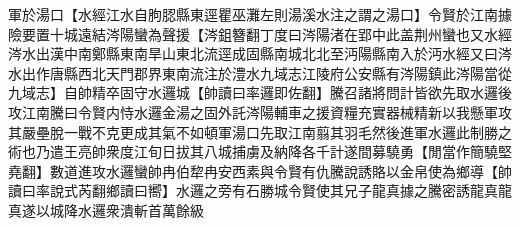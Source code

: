 軍於湯口【水經江水自朐䏰縣東逕瞿巫灘左則湯溪水注之謂之湯口】令賢於江南據險要置十城遠結涔陽蠻為聲援【涔鉏簪翻丁度曰涔陽渚在郢中此盖荆州蠻也又水經涔水出漢中南鄭縣東南旱山東北流逕成固縣南城北北至沔陽縣南入於沔水經又曰涔水出作唐縣西北天門郡界東南流注於澧水九域志江陵府公安縣有涔陽鎮此涔陽當從九域志】自帥精卒固守水邏城【帥讀曰率邏即佐翻】騰召諸將問計皆欲先取水邏後攻江南騰曰令賢内恃水邏金湯之固外託涔陽輔車之援資糧充實器械精新以我懸軍攻其嚴壘脫一戰不克更成其氣不如頓軍湯口先取江南翦其羽毛然後進軍水邏此制勝之術也乃遣王亮帥衆度江旬日拔其八城捕虜及納降各千計遂間募驍勇【閒當作簡驍堅堯翻】數道進攻水邏蠻帥冉伯犂冉安西素與令賢有仇騰說誘賂以金帛使為鄉導【帥讀曰率說式芮翻鄉讀曰嚮】水邏之旁有石勝城令賢使其兄子龍真據之騰密誘龍真龍真遂以城降水邏衆潰斬首萬餘級